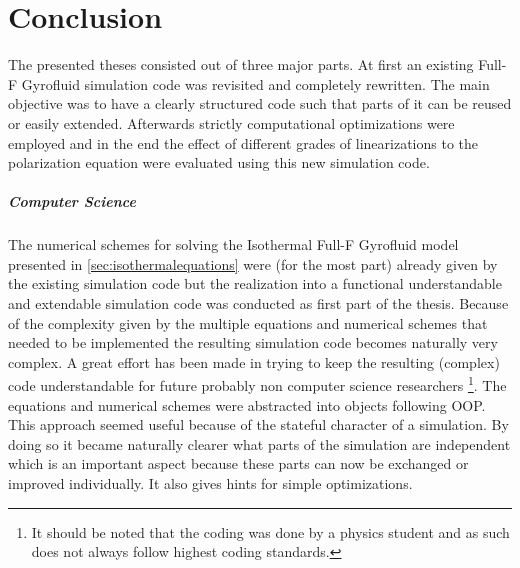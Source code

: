 \documentclass[master.tex]{subfiles}
\begin{document}
\chapter{Conclusion}
The presented theses consisted out of three major parts. At first an existing Full-F Gyrofluid simulation code was revisited and completely rewritten. The main objective was to have a clearly structured code such that parts of it can be reused or easily extended. Afterwards strictly computational optimizations were employed and in the end the effect of different grades of linearizations to the polarization equation were evaluated using this new simulation code.



\paragraph{Computer Science}
The numerical schemes for solving the Isothermal Full-F Gyrofluid model presented in \autoref{sec:isothermalequations} were (for the most part) already given by the existing simulation code but the realization into a functional understandable and extendable simulation code was conducted as first part of the thesis. Because of the complexity given by the multiple equations and numerical schemes that needed to be implemented the resulting simulation code becomes naturally very complex. A great effort has been made in trying to keep the resulting (complex) code understandable for future probably non computer science researchers \footnote{It should be noted that the coding was done by a physics student and as such does not always follow highest coding standards.}. The equations and numerical schemes were abstracted into objects following \ac{OOP}. This approach seemed useful because of the stateful character of a simulation. By doing so it became naturally clearer what parts of the simulation are independent which is an important aspect because these parts can now be exchanged or improved individually. It also gives hints for simple optimizations.
\end{document}
